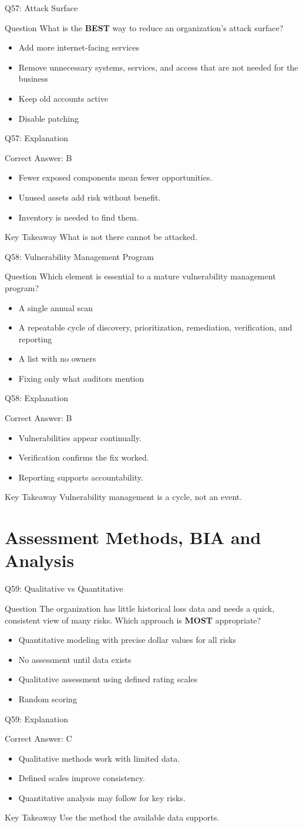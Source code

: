 \documentclass[aspectratio=169]{beamer}
\newcommand{\hq}[7]{%
	\begin{frame}{Q#1: #2}
		\begin{block}{Question}
			#3
		\end{block}
		\begin{itemize}
			#4
		\end{itemize}
	\end{frame}
	\begin{frame}{Q#1: Explanation}
		\begin{block}{Correct Answer: #5}
			\begin{itemize}
				#6
			\end{itemize}
		\end{block}
		\begin{alertblock}{Key Takeaway}
			#7
		\end{alertblock}
	\end{frame}
}
\begin{document}
	\hq{57}{Attack Surface}
	{What is the \textbf{BEST} way to reduce an organization's attack surface?}
	{\item[\textbf{(A)}] Add more internet-facing services
		\item[\textbf{(B)}] Remove unnecessary systems, services, and access that are not needed for the business
		\item[\textbf{(C)}] Keep old accounts active
		\item[\textbf{(D)}] Disable patching}
	{B}
	{\item Fewer exposed components mean fewer opportunities.
		\item Unused assets add risk without benefit.
		\item Inventory is needed to find them.}
	{What is not there cannot be attacked.}
	
	\hq{58}{Vulnerability Management Program}
	{Which element is essential to a mature vulnerability management program?}
	{\item[\textbf{(A)}] A single annual scan
		\item[\textbf{(B)}] A repeatable cycle of discovery, prioritization, remediation, verification, and reporting
		\item[\textbf{(C)}] A list with no owners
		\item[\textbf{(D)}] Fixing only what auditors mention}
	{B}
	{\item Vulnerabilities appear continually.
		\item Verification confirms the fix worked.
		\item Reporting supports accountability.}
	{Vulnerability management is a cycle, not an event.}
	
	\section{Assessment Methods, BIA and Analysis}
	
	\hq{59}{Qualitative vs Quantitative}
	{The organization has little historical loss data and needs a quick, consistent view of many risks. Which approach is \textbf{MOST} appropriate?}
	{\item[\textbf{(A)}] Quantitative modeling with precise dollar values for all risks
		\item[\textbf{(B)}] No assessment until data exists
		\item[\textbf{(C)}] Qualitative assessment using defined rating scales
		\item[\textbf{(D)}] Random scoring}
	{C}
	{\item Qualitative methods work with limited data.
		\item Defined scales improve consistency.
		\item Quantitative analysis may follow for key risks.}
	{Use the method the available data supports.}
	
\end{document}
